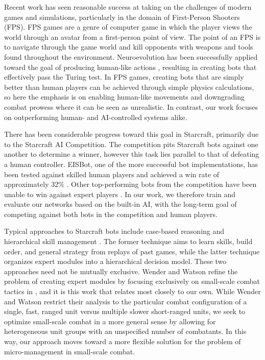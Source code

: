 \documentclass[a4paper]{article}
\begin{document}
Recent work has seen reasonable success at taking on the challenges of modern games and simulations, particularly in the domain of First-Person Shooters (FPS). FPS games are a genre of computer game in which the player views the world through an avatar from a first-person point of view. The point of an FPS is to navigate through the game world and kill opponents with weapons and tools found throughout the environment. Neuroevolution has been successfully applied toward the goal of producing human-like actions \cite{schrum:cig11competition}, resulting in creating bots that effectively pass the Turing test. In FPS games, creating bots that are simply better than human players can be achieved through simple physics calculations, so here the emphasis is on enabling human-like movements and downgrading combat prowess where it can be seen as unrealistic. In contrast, our work focuses on outperforming human- and AI-controlled systems alike.

There has been considerable progress toward this goal in Starcraft, primarily due to the Starcraft AI Competition. The competition pits Starcraft bots against one another to determine a winner, however this task lies parallel to that of defeating a human controller. EISBot, one of the more successful bot implementations, has been tested against skilled human players and achieved a win rate of approximately 32\% \cite{weber2011building}. Other top-performing bots from the competition have been unable to win against expert players \cite{ai_comp_2010_website}. In our work, we therefore train and evaluate our networks based on the built-in AI, with the long-term goal of competing against both bots in the competition and human players.

Typical approaches to Starcraft bots include case-based reasoning \cite{weber2009case, weber2010case, cadena2011fuzzy} and hierarchical skill management \cite{mccoy2008integrated}. The former technique aims to learn skills, build order, and general strategy from replays of past games, while the latter technique organizes expert modules into a hierarchical decision model. These two approaches need not be mutually exclusive. Wender and Watson refine the problem of creating expert modules by focusing exclusively on small-scale combat tactics in \cite{rl_small_scale_combat}, and it is this work that relates most closely to our own. While Wender and Watson restrict their analysis to the particular combat configuration of a single, fast, ranged unit versus multiple slower short-ranged units, we seek to optimize small-scale combat in a more general sense by allowing for heterogeneous unit groups with an unspecified number of combatants. In this way, our approach moves toward a more flexible solution for the problem of micro-management in small-scale combat. 
\end{document}

